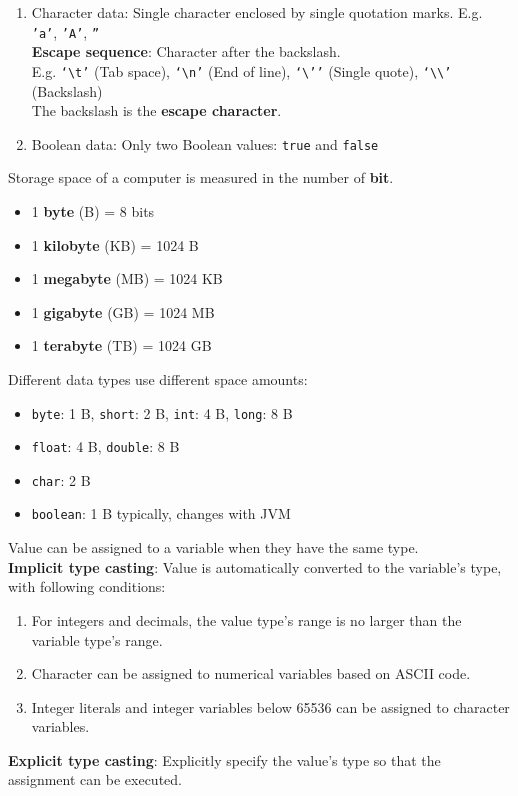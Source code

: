 \documentclass{article}
\begin{document}
\begin{enumerate}
	\item Character data: Single character enclosed by single quotation marks. E.g. \texttt{'a'}, \texttt{'A'}, \texttt{''}\\
	\textbf{Escape sequence}: Character after the backslash.\\
	E.g. \texttt{`{\textbackslash}t'} (Tab space), \texttt{`{\textbackslash}n'} (End of line), \texttt{`{\textbackslash}''} (Single quote), \texttt{`{\textbackslash\textbackslash}'} (Backslash)\\
	The backslash is the \textbf{escape character}.
	\item Boolean data: Only two Boolean values: \texttt{true} and \texttt{false}
\end{enumerate}
\newpage

Storage space of a computer is measured in the number of \textbf{bit}.
\begin{itemize}
	\item 1 \textbf{byte} (B) = 8 bits
	\item 1 \textbf{kilobyte} (KB) = 1024 B
	\item 1 \textbf{megabyte} (MB) = 1024 KB
	\item 1 \textbf{gigabyte} (GB) = 1024 MB
	\item 1 \textbf{terabyte} (TB) = 1024 GB
\end{itemize}
Different data types use different space amounts:
\begin{itemize}
	\item \texttt{byte}: 1 B, \texttt{short}: 2 B, \texttt{int}: 4 B, \texttt{long}: 8 B
	\item \texttt{float}: 4 B, \texttt{double}: 8 B
	\item \texttt{char}: 2 B
	\item \texttt{boolean}: 1 B typically, changes with JVM 
\end{itemize}
Value can be assigned to a variable when they have the same type.\\
\textbf{Implicit type casting}: Value is automatically converted to the variable's type, with following conditions:
\begin{enumerate}
	\item For integers and decimals, the value type's range is no larger than the variable type's range.
	\item Character can be assigned to numerical variables based on ASCII code.
	\item Integer literals and integer variables below 65536 can be assigned to character variables.
\end{enumerate}
\textbf{Explicit type casting}: Explicitly specify the value's type so that the assignment can be executed.
\end{document}
